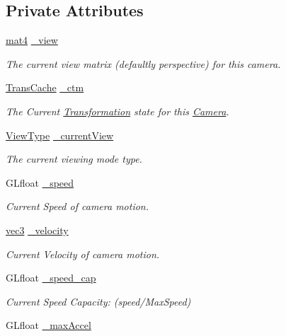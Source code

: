 \subsection*{Private Attributes}
\begin{DoxyCompactItemize}
\item 
\hyperlink{class_angel_1_1mat4}{mat4} \hyperlink{class_camera_a28f6e710df6db726568cd0f2bbd3643a}{\-\_\-view}
\begin{DoxyCompactList}\small\item\em The current view matrix (defaultly perspective) for this camera. \end{DoxyCompactList}\item 
\hyperlink{class_trans_cache}{Trans\-Cache} \hyperlink{class_camera_a6c1e31c8470b923f9f872f73597cb95b}{\-\_\-ctm}
\begin{DoxyCompactList}\small\item\em The Current \hyperlink{class_transformation}{Transformation} state for this \hyperlink{class_camera}{Camera}. \end{DoxyCompactList}\item 
\hyperlink{class_camera_aaa256acd50a2fa143d9f8d9456e2802f}{View\-Type} \hyperlink{class_camera_ac9062d9bb891aa81d163076738451081}{\-\_\-current\-View}
\begin{DoxyCompactList}\small\item\em The current viewing mode type. \end{DoxyCompactList}\item 
G\-Lfloat \hyperlink{class_camera_a21f8eb53e5369018e39add0453ae626d}{\-\_\-speed}
\begin{DoxyCompactList}\small\item\em Current Speed of camera motion. \end{DoxyCompactList}\item 
\hyperlink{struct_angel_1_1vec3}{vec3} \hyperlink{class_camera_aa15577ff9e67c81699ee86d4d20a7ee7}{\-\_\-velocity}
\begin{DoxyCompactList}\small\item\em Current Velocity of camera motion. \end{DoxyCompactList}\item 
\hypertarget{class_camera_a4d875d29a43bdfed4eac4c76747939d3}{G\-Lfloat \hyperlink{class_camera_a4d875d29a43bdfed4eac4c76747939d3}{\-\_\-speed\-\_\-cap}}\label{class_camera_a4d875d29a43bdfed4eac4c76747939d3}

\begin{DoxyCompactList}\small\item\em Current Speed Capacity\-: (speed/\-Max\-Speed) \end{DoxyCompactList}\item 
\hypertarget{class_camera_acbfae99c73c118ca92be9a6ba664b303}{G\-Lfloat \hyperlink{class_camera_acbfae99c73c118ca92be9a6ba664b303}{\-\_\-max\-Accel}}\label{class_camera_acbfae99c73c118ca92be9a6ba664b303}


\end{DoxyCompactItemize}

